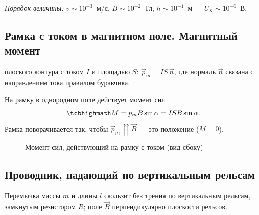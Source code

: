 \documentclass[11pt,a4paper]{article}
\begin{document}
\emph{Порядок величины:} $v\sim10^{-3}$~м/с, $B\sim10^{-2}$~Тл, $h\sim10^{-1}$~м — $U_{\text{Х}}\sim10^{-6}$~В.

\subsection{Рамка с током в магнитном поле. Магнитный момент}
\begin{opr}
 плоского контура с током $I$ и площадью $S$: $\vec p_m=IS\,\vec n$, где нормаль $\vec n$ связана с направлением
тока правилом буравчика.
\end{opr}

На рамку в однородном поле действует момент сил
\[
\kbox{M=p_mB\sin\alpha=ISB\sin\alpha.}
\]
Рамка поворачивается так, чтобы $\vec p_m\upuparrows\vec B$ — это положение  ($M=0$).

\begin{figure}[H]
\centering
{}
\caption{Момент сил, действующий на рамку с током (вид сбоку)}
\end{figure}

\subsection{Проводник, падающий по вертикальным рельсам}
Перемычка массы $m$ и длины $l$ скользит без трения по вертикальным рельсам, замкнутым резистором $R$; поле $\vec B$
перпендикулярно плоскости рельсов.
\end{document}
